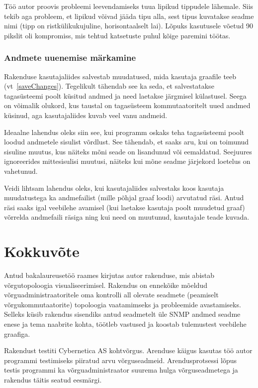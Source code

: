 \documentclass[12pt]{article}
\begin{document}
Töö autor proovis probleemi leevendamiseks tuua lipikud tippudele lähemale.
Siis tekib aga probleem, et lipikud võivad jääda tipu alla, sest tipus kuvatakse seadme nimi (tipp
on ristkülikukujuline, horisontaalselt lai).
Lõpuks kasutusele võetud 90 pikslit oli kompromiss, mis tehtud katsetuste puhul kõige paremini töötas.

\subsubsection{Andmete uuenemise märkamine}
Rakenduse kasutajaliides salvestab muudatused, mida kasutaja graafile teeb (vt~\ref{saveChanges}).
Tegelikult tähendab see ka seda, et salvestatakse tagasüsteemi poolt küsitud andmed ja need
laetakse järgmisel külastusel.
Seega on võimalik olukord, kus taustal on tagasüsteem kommutaatoritelt uued andmed küsinud, aga
kasutajaliides kuvab veel vanu andmeid.

Ideaalne lahendus oleks siin see, kui programm oskaks teha tagasüsteemi poolt loodud andmetele
sisulist võrdlust.
See tähendab, et saaks aru, kui on toimunud sisuline muutus, kus näiteks mõni seade on lisandunud
või eemaldatud.
Seejuures ignoreerides mittesisulisi muutusi, näiteks kui mõne seadme järjekord loetelus on
vahetunud.

Veidi lihtsam lahendus oleks, kui kasutajaliides salvestaks koos kasutaja muudatustega ka
andmefailist (mille põhjal graaf loodi) arvutatud räsi.
Antud räsi saaks igal veebilehe avamisel (kui laetakse kasutaja poolt muudetud graaf) võrrelda
andmefaili räsiga ning kui need on muutunud, kasutajale teade kuvada.

\clearpage
\section{Kokkuvõte}

Antud bakalaureusetöö raames kirjutas autor rakenduse, mis abistab võrgutopoloogia
visualiseerimisel.
Rakendus on ennekõike mõeldud võrguadministraatoritele oma kontrolli all olevate seadmete (peamiselt
võrgukommutaatorite) topoloogia vaatamimseks ja probleemide avastamiseks.
Selleks küsib rakendus sisendiks antud seadmetelt üle SNMP andmed seadme enese ja tema naabrite
kohta, töötleb vastused ja koostab tulemustest veebilehe graafiga.

Rakendust testiti Cybernetica AS kohtvõrgus.
Arenduse käigus kasutas töö autor programmi testimiseks piiratud arvu võrguseadmeid.
Arendusprotsessi lõpus testis programmi ka võrguadministraator suurema hulga võrguseadmetega ja
rakendus täitis seatud eesmärgi.
\end{document}
